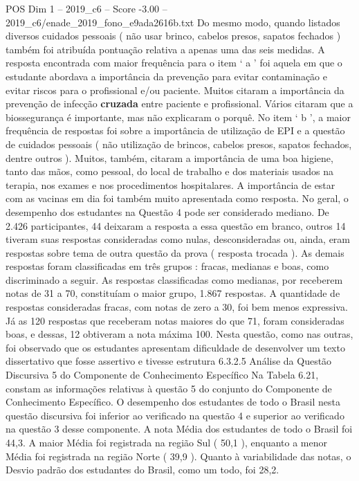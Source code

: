 \begin{textsample}{POS Dim 1 – 2019\_c6 – Score -3.00 – 2019\_c6/enade\_2019\_fono\_e9ada2616b.txt}
Do mesmo modo, quando listados diversos cuidados pessoais ( não usar brinco, cabelos presos, sapatos fechados ) também foi atribuída pontuação relativa a apenas uma das seis medidas.
A resposta encontrada com maior frequência para o item ‘ a ’ foi aquela em que o estudante abordava a importância da prevenção para evitar contaminação e evitar riscos para o profissional e/ou paciente.
Muitos citaram a importância da prevenção de infecção \textbf{cruzada} entre paciente e profissional.
Vários citaram que a biossegurança é importante, mas não explicaram o porquê.
No item ‘ b ’, a maior frequência de respostas foi sobre a importância de utilização de EPI e a questão de cuidados pessoais ( não utilização de brincos, cabelos presos, sapatos fechados, dentre outros ).
Muitos, também, citaram a importância de uma boa higiene, tanto das mãos, como pessoal, do local de trabalho e dos materiais usados na terapia, nos exames e nos procedimentos hospitalares.
A importância de estar com as vacinas em dia foi também muito apresentada como resposta.
No geral, o desempenho dos estudantes na Questão 4 pode ser considerado mediano.
De 2.426 participantes, 44 deixaram a resposta a essa questão em branco, outros 14 tiveram suas respostas consideradas como nulas, desconsideradas ou, ainda, eram respostas sobre tema de outra questão da prova ( resposta trocada ).
As demais respostas foram classificadas em três grupos : fracas, medianas e boas, como discriminado a seguir.
As respostas classificadas como medianas, por receberem notas de 31 a 70, constituíam o maior grupo, 1.867 respostas.
A quantidade de respostas consideradas fracas, com notas de zero a 30, foi bem menos expressiva.
Já as 120 respostas que receberam notas maiores do que 71, foram consideradas boas, e dessas, 12 obtiveram a nota máxima 100.
Nesta questão, como nas outras, foi observado que os estudantes apresentam dificuldade de desenvolver um texto dissertativo que fosse assertivo e tivesse estrutura 6.3.2.5 Análise da Questão Discursiva 5 do Componente de Conhecimento Específico Na Tabela 6.21, constam as informações relativas à questão 5 do conjunto do Componente de Conhecimento Específico.
O desempenho dos estudantes de todo o Brasil nesta questão discursiva foi inferior ao verificado na questão 4 e superior ao verificado na questão 3 desse componente.
A nota Média dos estudantes de todo o Brasil foi 44,3.
A maior Média foi registrada na região Sul ( 50,1 ), enquanto a menor Média foi registrada na região Norte ( 39,9 ).
Quanto à variabilidade das notas, o Desvio padrão dos estudantes do Brasil, como um todo, foi 28,2.

\end{textsample}
